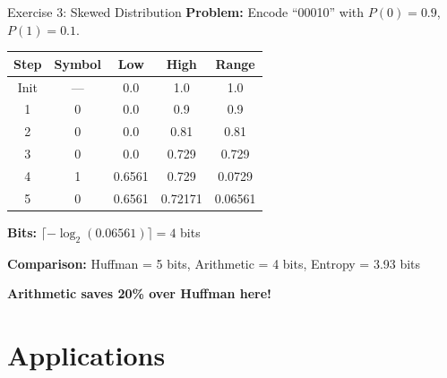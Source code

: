 \documentclass[aspectratio=169,12pt]{beamer}
\begin{document}
\begin{frame}{Exercise 3: Skewed Distribution}
    \textbf{Problem:} Encode ``00010'' with $P(0) = 0.9$, $P(1) = 0.1$.
    
    \begin{center}
        \small
        \begin{tabular}{c|c|c|c|c}
            \toprule
            Step & Symbol & Low & High & Range \\
            \midrule
            Init & --- & 0.0 & 1.0 & 1.0 \\
            1 & 0 & 0.0 & 0.9 & 0.9 \\
            2 & 0 & 0.0 & 0.81 & 0.81 \\
            3 & 0 & 0.0 & 0.729 & 0.729 \\
            4 & 1 & 0.6561 & 0.729 & 0.0729 \\
            5 & 0 & 0.6561 & 0.72171 & 0.06561 \\
            \bottomrule
        \end{tabular}
    \end{center}
    
    \textbf{Bits:} $\lceil -\log_2(0.06561) \rceil = 4$ bits
    
    \textbf{Comparison:} Huffman = 5 bits, Arithmetic = 4 bits, Entropy = 3.93 bits
    
    \textbf{Arithmetic saves 20\% over Huffman here!}
\end{frame}

\section{Applications}
\end{document}
